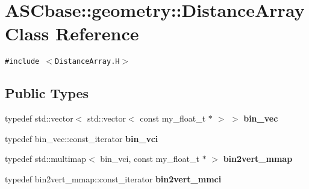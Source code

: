 \section{ASCbase::geometry::Distance\-Array Class Reference}
\label{classASCbase_1_1geometry_1_1DistanceArray}
{\tt \#include $<$Distance\-Array.H$>$}

\subsection*{Public Types}
\begin{CompactItemize}
\item 
typedef std::vector$<$ std::vector$<$ const my\_\-float\_\-t $\ast$ $>$ $>$ \textbf{bin\_\-vec}\label{classASCbase_1_1geometry_1_1DistanceArray_c997ffd8bddac3ff42c7dbc23c39e47d}

\item 
typedef bin\_\-vec::const\_\-iterator \textbf{bin\_\-vci}\label{classASCbase_1_1geometry_1_1DistanceArray_4a9a352c0bef59cc6afd3288b7465c8c}

\item 
typedef std::multimap$<$ bin\_\-vci, const my\_\-float\_\-t $\ast$ $>$ \textbf{bin2vert\_\-mmap}\label{classASCbase_1_1geometry_1_1DistanceArray_60d957c24874b08bca3c6e3f00a09ce5}

\item 
typedef bin2vert\_\-mmap::const\_\-iterator \textbf{bin2vert\_\-mmci}\label{classASCbase_1_1geometry_1_1DistanceArray_ec84c66a10ac537a7e6f84c1d558224e}

\end{CompactItemize}
